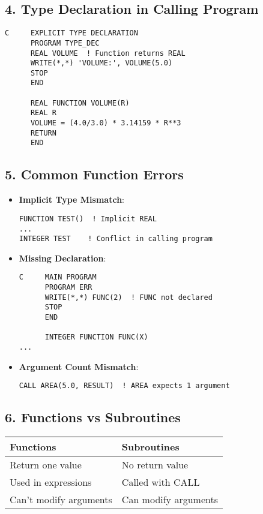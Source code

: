 \documentclass{book}
\begin{document}
\subsection*{4. Type Declaration in Calling Program}
\begin{verbatim}
C     EXPLICIT TYPE DECLARATION
      PROGRAM TYPE_DEC
      REAL VOLUME  ! Function returns REAL
      WRITE(*,*) 'VOLUME:', VOLUME(5.0)
      STOP
      END

      REAL FUNCTION VOLUME(R)
      REAL R
      VOLUME = (4.0/3.0) * 3.14159 * R**3
      RETURN
      END
\end{verbatim}

\subsection*{5. Common Function Errors}
\begin{itemize}
\item \textbf{Implicit Type Mismatch}:
\begin{verbatim}
FUNCTION TEST()  ! Implicit REAL
...
INTEGER TEST    ! Conflict in calling program
\end{verbatim}

\item \textbf{Missing Declaration}:
\begin{verbatim}
C     MAIN PROGRAM
      PROGRAM ERR
      WRITE(*,*) FUNC(2)  ! FUNC not declared
      STOP
      END

      INTEGER FUNCTION FUNC(X)
...
\end{verbatim}

\item \textbf{Argument Count Mismatch}:
\begin{verbatim}
CALL AREA(5.0, RESULT)  ! AREA expects 1 argument
\end{verbatim}
\end{itemize}

\subsection*{6. Functions vs Subroutines}
\begin{center}
\begin{tabular}{|l|l|}
\hline
\textbf{Functions} & \textbf{Subroutines} \\ 
\hline
Return one value & No return value \\
Used in expressions & Called with CALL \\
Can't modify arguments & Can modify arguments \\
\hline
\end{tabular}
\end{center}
\end{document}
